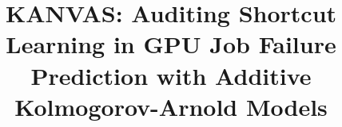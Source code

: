 \documentclass[conference]{IEEEtran}
\begin{document}
\title{KANVAS: Auditing Shortcut Learning in GPU Job Failure Prediction with Additive Kolmogorov-Arnold Models}

\author{
}

\maketitle















\end{document}
